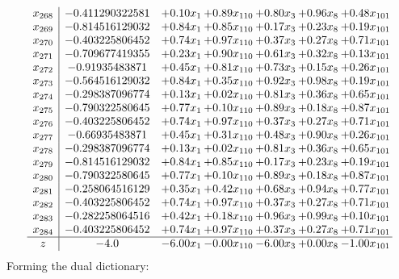 \documentclass[8pt]{article}
\begin{document}
\[\begin{array}{c| c c@{\hskip 2pt} c@{\hskip 2pt} c@{\hskip 2pt} c@{\hskip 2pt} c@{\hskip 2pt} }
 x_{268}   &  -0.411290322581 & +  0.10 x_{1} & +  0.89 x_{110} & +  0.80 x_{3} & +  0.96 x_{8} & +  0.48 x_{101}\\
 x_{269}   &  -0.814516129032 & +  0.84 x_{1} & +  0.85 x_{110} & +  0.17 x_{3} & +  0.23 x_{8} & +  0.19 x_{101}\\
 x_{270}   &  -0.403225806452 & +  0.74 x_{1} & +  0.97 x_{110} & +  0.37 x_{3} & +  0.27 x_{8} & +  0.71 x_{101}\\
 x_{271}   &  -0.709677419355 & +  0.23 x_{1} & +  0.90 x_{110} & +  0.61 x_{3} & +  0.32 x_{8} & +  0.13 x_{101}\\
 x_{272}   &  -0.91935483871 & +  0.45 x_{1} & +  0.81 x_{110} & +  0.73 x_{3} & +  0.15 x_{8} & +  0.26 x_{101}\\
 x_{273}   &  -0.564516129032 & +  0.84 x_{1} & +  0.35 x_{110} & +  0.92 x_{3} & +  0.98 x_{8} & +  0.19 x_{101}\\
 x_{274}   &  -0.298387096774 & +  0.13 x_{1} & +  0.02 x_{110} & +  0.81 x_{3} & +  0.36 x_{8} & +  0.65 x_{101}\\
 x_{275}   &  -0.790322580645 & +  0.77 x_{1} & +  0.10 x_{110} & +  0.89 x_{3} & +  0.18 x_{8} & +  0.87 x_{101}\\
 x_{276}   &  -0.403225806452 & +  0.74 x_{1} & +  0.97 x_{110} & +  0.37 x_{3} & +  0.27 x_{8} & +  0.71 x_{101}\\
 x_{277}   &  -0.66935483871 & +  0.45 x_{1} & +  0.31 x_{110} & +  0.48 x_{3} & +  0.90 x_{8} & +  0.26 x_{101}\\
 x_{278}   &  -0.298387096774 & +  0.13 x_{1} & +  0.02 x_{110} & +  0.81 x_{3} & +  0.36 x_{8} & +  0.65 x_{101}\\
 x_{279}   &  -0.814516129032 & +  0.84 x_{1} & +  0.85 x_{110} & +  0.17 x_{3} & +  0.23 x_{8} & +  0.19 x_{101}\\
 x_{280}   &  -0.790322580645 & +  0.77 x_{1} & +  0.10 x_{110} & +  0.89 x_{3} & +  0.18 x_{8} & +  0.87 x_{101}\\
 x_{281}   &  -0.258064516129 & +  0.35 x_{1} & +  0.42 x_{110} & +  0.68 x_{3} & +  0.94 x_{8} & +  0.77 x_{101}\\
 x_{282}   &  -0.403225806452 & +  0.74 x_{1} & +  0.97 x_{110} & +  0.37 x_{3} & +  0.27 x_{8} & +  0.71 x_{101}\\
 x_{283}   &  -0.282258064516 & +  0.42 x_{1} & +  0.18 x_{110} & +  0.96 x_{3} & +  0.99 x_{8} & +  0.10 x_{101}\\
 x_{284}   &  -0.403225806452 & +  0.74 x_{1} & +  0.97 x_{110} & +  0.37 x_{3} & +  0.27 x_{8} & +  0.71 x_{101}\\
\hline
z    &  -4.0 & -6.00 x_{1} & -0.00 x_{110} & -6.00 x_{3} & +  0.00 x_{8} & -1.00 x_{101}\\
\end{array}\]
Forming the dual dictionary:
\end{document}
